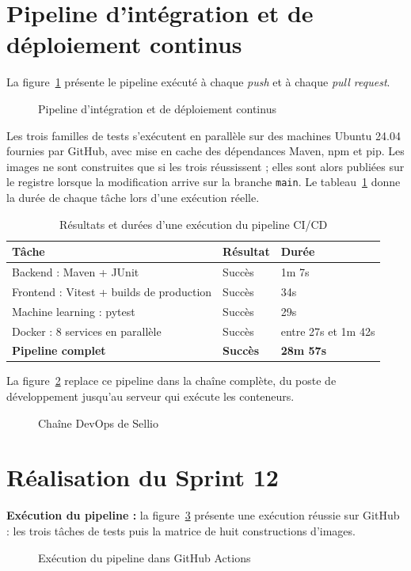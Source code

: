 \section{Pipeline d'intégration et de déploiement continus}
La figure~\ref{fig:pipeline} présente le pipeline exécuté à chaque \textit{push} et à chaque \textit{pull request}.
\begin{figure}[H]
    \centering
    \caption{Pipeline d'intégration et de déploiement continus}
    \label{fig:pipeline}
\end{figure}

Les trois familles de tests s'exécutent en parallèle sur des machines Ubuntu 24.04 fournies par GitHub, avec mise en cache des dépendances Maven, npm et pip. Les images ne sont construites que si les trois réussissent ; elles sont alors publiées sur le registre lorsque la modification arrive sur la branche \texttt{main}. Le tableau~\ref{tab:jobs} donne la durée de chaque tâche lors d'une exécution réelle.
\begin{table}[H]
\centering
\renewcommand{\arraystretch}{1.3}
\begin{tabular}{|p{7cm}|p{3cm}|p{2.2cm}|}
\hline
\textbf{Tâche} & \textbf{Résultat} & \textbf{Durée} \\
\hline
Backend : Maven + JUnit & Succès & 1m 7s \\
\hline
Frontend : Vitest + builds de production & Succès & 34s \\
\hline
Machine learning : pytest & Succès & 29s \\
\hline
Docker : 8 services en parallèle & Succès & entre 27s et 1m 42s \\
\hline
\textbf{Pipeline complet} & \textbf{Succès} & \textbf{28m 57s} \\
\hline
\end{tabular}
\caption{Résultats et durées d'une exécution du pipeline CI/CD}
\label{tab:jobs}
\end{table}

La figure~\ref{fig:archi-devops} replace ce pipeline dans la chaîne complète, du poste de développement jusqu'au serveur qui exécute les conteneurs.
\begin{figure}[H]
    \centering
    \caption{Chaîne DevOps de Sellio}
    \label{fig:archi-devops}
\end{figure}

\section{Réalisation du Sprint 12}
\textbf{Exécution du pipeline :} la figure~\ref{fig:ui-actions} présente une exécution réussie sur GitHub : les trois tâches de tests puis la matrice de huit constructions d'images.
\begin{figure}[H]
    \centering
    \caption{Exécution du pipeline dans GitHub Actions}
    \label{fig:ui-actions}
\end{figure}

